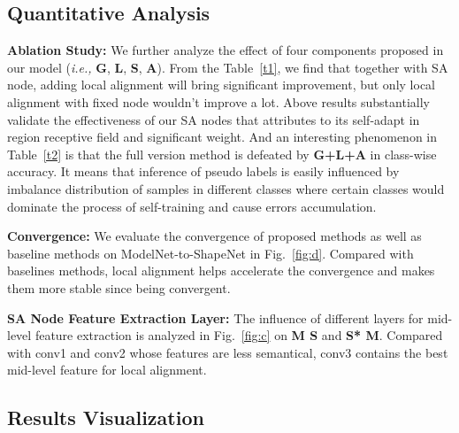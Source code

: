\documentclass{article}
\begin{document}
\subsection{Quantitative Analysis}\label{QA}

\textbf{Ablation Study: } We further analyze the effect of four components proposed in our model (\textit{i.e.,} \textbf{G}, \textbf{L}, \textbf{S}, \textbf{A}). From the Table~\ref{t1}, we find that together with SA node, adding local alignment will bring significant improvement, but only local alignment with fixed node wouldn't improve a lot. Above results substantially validate the effectiveness of our SA nodes that attributes to its self-adapt in region receptive field and significant weight. And an interesting phenomenon in Table~\ref{t2} is that the full version method is defeated by \textbf{G+L+A} in class-wise accuracy. It means that inference of pseudo labels is easily influenced by imbalance distribution of samples in different classes where certain classes would dominate the process of self-training and cause errors accumulation.



\textbf{Convergence: }We evaluate the convergence of proposed methods as well as baseline methods on ModelNet-to-ShapeNet in Fig.~\ref{fig:d}. Compared with baselines methods, local alignment helps accelerate the convergence and makes them more stable since being convergent.

\textbf{SA Node Feature Extraction Layer: } The influence of different layers for mid-level feature extraction is analyzed in Fig.~\ref{fig:c} on \textbf{M  S} and \textbf{S*  M}. Compared with conv1 and conv2 whose features are less semantical, conv3 contains the best mid-level feature for local alignment.

\subsection{Results Visualization}
\end{document}
